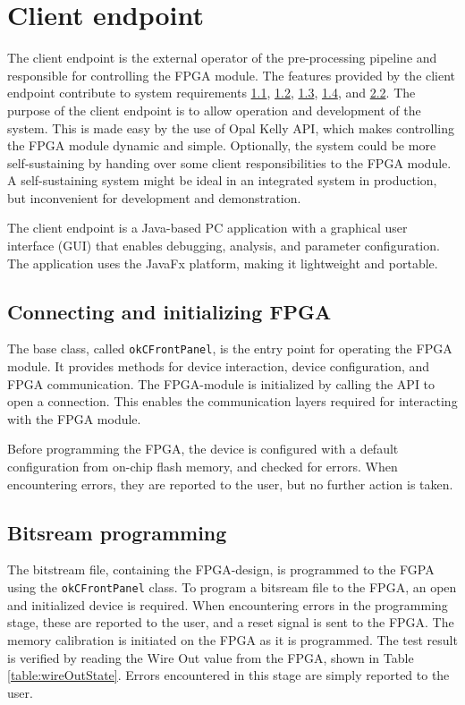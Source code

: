 \documentclass[12pt]{report}
\begin{document}
\section{Client endpoint}
The client endpoint is the external operator of the pre-processing pipeline and responsible for controlling the FPGA module. The features provided by the client endpoint contribute to system requirements \hyperref[req1.1]{1.1}, \hyperref[req1.2]{1.2}, \hyperref[req1.3]{1.3}, \hyperref[req1.4]{1.4}, and \hyperref[req2.2]{2.2}. The purpose of the client endpoint is to allow operation and development of the system. This is made easy by the use of Opal Kelly API, which makes controlling the FPGA module dynamic and simple. Optionally, the system could be more self-sustaining by handing over some client responsibilities to the FPGA module. A self-sustaining system might be ideal in an integrated system in production, but inconvenient for development and demonstration. \citep{stpp}
\par
The client endpoint is a Java-based PC application with a graphical user interface (GUI) that enables debugging, analysis, and parameter configuration. The application uses the JavaFx platform, making it lightweight and portable. \citep{stpp}
\par

\subsection{Connecting and initializing FPGA}
The base class, called \texttt{okCFrontPanel}, is the entry point for operating the FPGA module. It provides methods for device interaction, device configuration, and FPGA communication. The FPGA-module is initialized by calling the API to open a connection. This enables the communication layers required for interacting with the FPGA module. \citep*{FrontPanelMan} \citep{stpp}
\par
Before programming the FPGA, the device is configured with a default configuration from on-chip flash memory, and checked for errors. When encountering errors, they are reported to the user, but no further action is taken. \citep{stpp}

\subsection{Bitsream programming}
The bitstream file, containing the FPGA-design, is programmed to the FGPA using the \texttt{okCFrontPanel} class. To program a bitsream file to the FPGA, an open and initialized device is required. When encountering errors in the programming stage, these are reported to the user, and a reset signal is sent to the FPGA. The memory calibration is initiated on the FPGA as it is programmed. The test result is verified by reading the Wire Out value from the FPGA, shown in Table \ref*{table:wireOutState}. Errors encountered in this stage are simply reported to the user. \citep{stpp}
\end{document}
